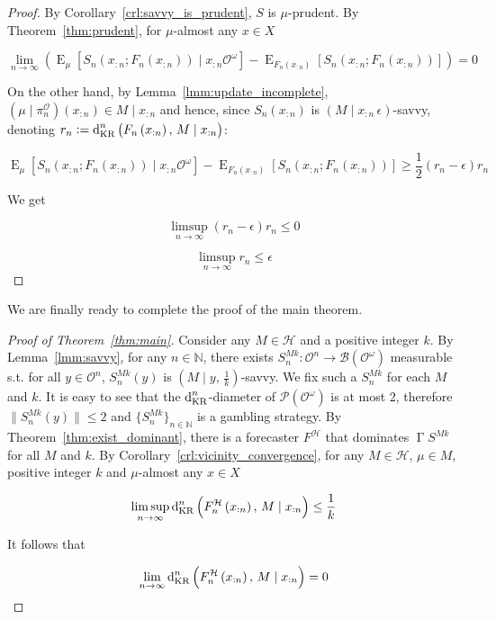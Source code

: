 \documentclass[11pt]{article}
\theoremstyle{definition}
\theoremstyle{plain}
\newcommand{\Nats}{\mathbb{N}}
\newcommand{\N}[1]{\lVert #1 \rVert}
\newcommand{\Sq}[2]{\{#1\}_{#2 \in \Nats}}
\newcommand{\Sqn}[1]{\Sq{#1}{n}}
\DeclareMathOperator{\E}{E}
\newcommand{\PM}{\mathcal{P}}
\newcommand{\DKR}{\operatorname{d}_{\textnormal{KR}}}
\newcommand{\Ob}{\mathcal{O}}
\newcommand{\OO}{\Ob^\omega}
\newcommand{\PO}{\pi^\Ob}
\newcommand{\PMO}{\PM(\OO)}
\newcommand{\MC}{\mathcal{H}}
\newcommand{\Gm}{\mathcal{B}}
\newcommand{\GMO}{\Gm(\OO)}
\DeclareMathOperator{\PG}{\Gamma}
\begin{document}
\begin{proof}

By Corollary~\ref{crl:savvy_is_prudent}, $S$ is $\mu$-prudent. By Theorem~\ref{thm:prudent}, for $\mu$-almost any $x \in X$

$$\lim_{n \rightarrow \infty} {\left(\E_{\mu}[S_n\left(x_{:n};F_n\left(x_{:n}\right)\right) \mid x_{:n}\OO]-\E_{F_n\left(x_{:n}\right)}[S_n\left(x_{:n};F_n\left(x_{:n}\right)\right)]\right)} = 0$$

On the other hand, by Lemma~\ref{lmm:update_incomplete}, $\left(\mu \mid \PO_n\right)\left(x_{:n}\right) \in M \mid x_{:n}$ and hence, since $S_n\left(x_{:n}\right)$ is $\left(M \mid x_{:n} \, \epsilon\right)$-savvy, denoting $r_n:=\DKR^n\left(F_n\left(x_{:n}\right),\, M \mid x_{:n}\right)$: 

$$\E_{\mu}[S_n\left(x_{:n};F_n\left(x_{:n}\right)\right) \mid x_{:n}\OO]-\E_{F_n\left(x_{:n}\right)}[S_n\left(x_{:n};F_n\left(x_{:n}\right)\right)] \geq \frac{1}{2} \left(r_{n} - \epsilon\right) r_n$$

We get

$$\limsup_{n \rightarrow \infty} {\left(r_{n} - \epsilon\right) r_n} \leq 0$$

$$\limsup_{n \rightarrow \infty} {r_n} \leq \epsilon$$
\end{proof}

We are finally ready to complete the proof of the main theorem.

\begin{proof}[Proof of Theorem~\ref{thm:main}]

Consider any $M \in \MC$ and a positive integer $k$. By Lemma~\ref{lmm:savvy}, for any $n \in \Nats$, there exists ${S^{Mk}_{n}: \Ob^n \rightarrow \GMO}$ measurable s.t. for all $y \in \Ob^n$, $S^{Mk}_{n}\left(y\right)$ is $\left(M \mid y,\,\frac{1}{k}\right)$-savvy. We fix such a $S^{Mk}_{n}$ for each $M$ and $k$. It is easy to see that the $\DKR^n$-diameter of $\PMO$ is at most 2, therefore $\N{S^{Mk}_{n}\left(y\right)} \leq 2$ and $\Sqn{S^{Mk}_{n}}$ is a gambling strategy. By Theorem~\ref{thm:exist_dominant}, there is a forecaster $F^\MC$ that dominates $\PG{S}^{Mk}$ for all $M$ and $k$. By Corollary~\ref{crl:vicinity_convergence}, for any $M \in \MC$, $\mu \in M$, positive integer $k$ and $\mu$-almost any $x \in X$

$$\limsup_{n \rightarrow \infty} {\DKR^n\left(F^\MC_n\left(x_{:n}\right),\,M \mid x_{:n}\right)} \leq \frac{1}{k}$$

It follows that

$$\lim_{n \rightarrow \infty} {\DKR^n\left(F^\MC_n\left(x_{:n}\right),\,M \mid x_{:n}\right)} = 0$$
\end{proof}
\end{document}

